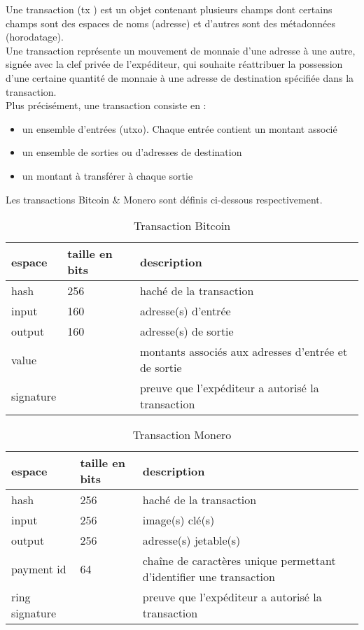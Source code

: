 Une transaction (\og tx \fg) est un objet contenant plusieurs champs dont certains champs sont 
des espaces de noms (adresse) et d'autres sont des métadonnées (horodatage).\\
Une transaction représente un mouvement de monnaie d'une adresse à une autre, 
signée avec la clef privée de l'expéditeur, qui souhaite réattribuer la possession d'une 
certaine quantité de monnaie à une adresse de destination spécifiée dans la transaction.\\
Plus précisément, une transaction consiste en :
\begin{itemize}
    \item un ensemble d'entrées (\acrshort{utxo}). Chaque entrée contient un montant associé
    \item un ensemble de sorties ou d'adresses de destination
    \item un montant à transférer à chaque sortie
\end{itemize}

\medskip
\noindent
Les transactions Bitcoin \& Monero sont définis ci-dessous respectivement.\\

\begin{table}[!ht]
    \centering
    \begin{tabular}{|l|l|l|}
    \hline
        espace & taille en bits & description \\ \hline
        hash & 256 & haché de la transaction \\ \hline
        input & 160 & adresse(s) d'entrée \\ \hline
        output & 160 & adresse(s) de sortie \\ \hline
        value & ~ & montants associés aux adresses d'entrée et de sortie \\ \hline
        signature & ~ & preuve que l'expéditeur a autorisé la transaction \\ \hline
    \end{tabular}
    \caption{Transaction Bitcoin}
\end{table}

\begin{table}[!ht]
    \centering
    \begin{tabular}{|l|l|l|}
    \hline
        espace & taille en bits & description \\ \hline
        hash & 256 & haché de la transaction \\ \hline
        input & 256 & image(s) clé(s) \\ \hline
        output & 256 & adresse(s) jetable(s) \\ \hline
        payment id & 64 & chaîne de caractères unique permettant d'identifier une transaction \\ \hline
        ring signature &  & preuve que l'expéditeur a autorisé la transaction \\ \hline
    \end{tabular}
    \caption{Transaction Monero}
\end{table}